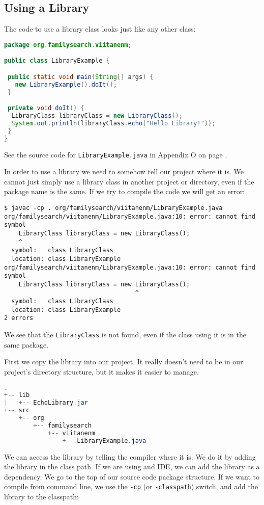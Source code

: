 \subsection{Using a Library}

The code to use a library class looks just like any other class:
\begin{lstlisting}[language=Java]
package org.familysearch.viitanenm;

public class LibraryExample {

 public static void main(String[] args) {
   new LibraryExample().doIt();
 }

 private void doIt() {
  LibraryClass libraryClass = new LibraryClass();
  System.out.println(libraryClass.echo("Hello Library!"));
 }
}
\end{lstlisting}

See the source code for \texttt{LibraryExample.java} in Appendix O on page \pageref{App:AppendixO}.

In order to use a library we need to somehow tell our project where it is. We cannot just simply use a library class in another project or directory, even if the package name is the same. If we try to compile the code we will get an error:
\begin{lstlisting}
$ javac -cp . org/familysearch/viitanenm/LibraryExample.java 
org/familysearch/viitanenm/LibraryExample.java:10: error: cannot find symbol
    LibraryClass libraryClass = new LibraryClass();
    ^
  symbol:   class LibraryClass
  location: class LibraryExample
org/familysearch/viitanenm/LibraryExample.java:10: error: cannot find symbol
    LibraryClass libraryClass = new LibraryClass();
                                    ^
  symbol:   class LibraryClass
  location: class LibraryExample
2 errors
\end{lstlisting}


We see that the \texttt{LibraryClass} is not found, even if the class using it is in the same package. 

First we copy the library into our project. It really doesn't need to be in our project's directory structure, but it makes it easier to manage.

\begin{lstlisting}[language=Java]
.
+-- lib
|   +-- EchoLibrary.jar
+-- src
    +-- org
        +-- familysearch
            +-- viitanenm
                +-- LibraryExample.java
\end{lstlisting}

We can access the library by telling the compiler where it is. We do it by adding the library in the class path. If we are using and IDE, we can add the library as a dependency. We go to the top of our source code package structure. If we want to compile from command line, we use the \texttt{-cp} (or \texttt{-classpath}) switch, and add the library to the classpath:

